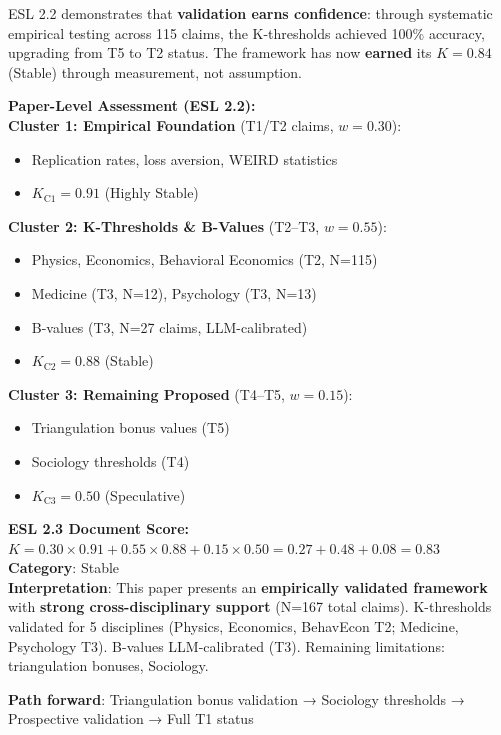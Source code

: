\documentclass[11pt,a4paper]{article}
\begin{document}
ESL 2.2 demonstrates that \textbf{validation earns confidence}: through systematic empirical testing across 115 claims, the K-thresholds achieved 100\% accuracy, upgrading from T5 to T2 status. The framework has now \textbf{earned} its $K = 0.84$ (Stable) through measurement, not assumption.

\begin{eslbox}
\textbf{Paper-Level Assessment (ESL 2.2):} \\[0.5em]
\textbf{Cluster 1: Empirical Foundation} (T1/T2 claims, $w = 0.30$):
\begin{itemize}
    \item Replication rates, loss aversion, WEIRD statistics
    \item $K_{\text{C1}} = 0.91$ (Highly Stable)
\end{itemize}

\textbf{Cluster 2: K-Thresholds \& B-Values} (T2--T3, $w = 0.55$):
\begin{itemize}
    \item Physics, Economics, Behavioral Economics (T2, N=115)
    \item Medicine (T3, N=12), Psychology (T3, N=13)
    \item B-values (T3, N=27 claims, LLM-calibrated)
    \item $K_{\text{C2}} = 0.88$ (Stable)
\end{itemize}

\textbf{Cluster 3: Remaining Proposed} (T4--T5, $w = 0.15$):
\begin{itemize}
    \item Triangulation bonus values (T5)
    \item Sociology thresholds (T4)
    \item $K_{\text{C3}} = 0.50$ (Speculative)
\end{itemize}

\textbf{ESL 2.3 Document Score:} \\
$K = 0.30 \times 0.91 + 0.55 \times 0.88 + 0.15 \times 0.50 = 0.27 + 0.48 + 0.08 = \mathbf{0.83}$ \\[0.3em]
\textbf{Category}: \textcolor{green!60!black}{Stable} \\[0.3em]
\textbf{Interpretation}: This paper presents an \textbf{empirically validated framework} with \textbf{strong cross-disciplinary support} (N=167 total claims). K-thresholds validated for 5 disciplines (Physics, Economics, BehavEcon T2; Medicine, Psychology T3). B-values LLM-calibrated (T3). Remaining limitations: triangulation bonuses, Sociology.

\textbf{Path forward}: Triangulation bonus validation → Sociology thresholds → Prospective validation → Full T1 status
\end{eslbox}
\end{document}
